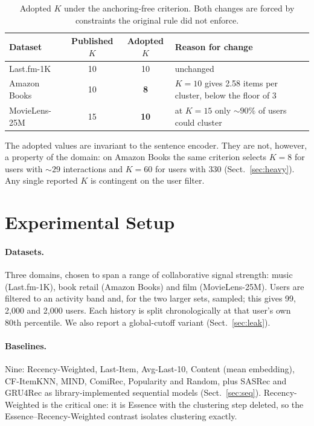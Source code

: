 \documentclass[runningheads]{llncs}
\begin{document}
\begin{table}[tb]
\caption{Adopted $K$ under the anchoring-free criterion. Both changes are forced by
constraints the original rule did not enforce.}\label{tab:k}
\centering
\small
\begin{tabular}{@{}lccp{5.1cm}@{}}
\toprule
Dataset & Published $K$ & Adopted $K$ & Reason for change \\
\midrule
Last.fm-1K & 10 & 10 & unchanged \\
Amazon Books & 10 & \textbf{8} & $K=10$ gives 2.58 items per cluster, below the floor of 3 \\
MovieLens-25M & 15 & \textbf{10} & at $K=15$ only ${\sim}90\%$ of users could cluster \\
\bottomrule
\end{tabular}
\end{table}

The adopted values are invariant to the sentence encoder. They are not, however, a property
of the domain: on Amazon Books the same criterion selects $K=8$ for users with ${\sim}29$
interactions and $K=60$ for users with 330 (Sect.~\ref{sec:heavy}). Any single reported $K$
is contingent on the user filter.

\section{Experimental Setup}

\paragraph{Datasets.} Three domains, chosen to span a range of collaborative signal
strength: music (Last.fm-1K), book retail (Amazon Books) and film (MovieLens-25M).
Users are filtered to an activity band and, for the two larger sets, sampled; this
gives 99, 2{,}000 and 2{,}000 users. Each history is split chronologically at that
user's own 80th percentile. We also report a global-cutoff variant
(Sect.~\ref{sec:leak}).

\paragraph{Baselines.} Nine: Recency-Weighted, Last-Item, Avg-Last-10, Content
(mean embedding), CF-ItemKNN, MIND, ComiRec, Popularity and Random, plus SASRec and
GRU4Rec as library-implemented sequential models (Sect.~\ref{sec:seq}).
Recency-Weighted is the critical one: it is Essence with the clustering step deleted, so
the Essence--Recency-Weighted contrast isolates clustering exactly.
\end{document}
